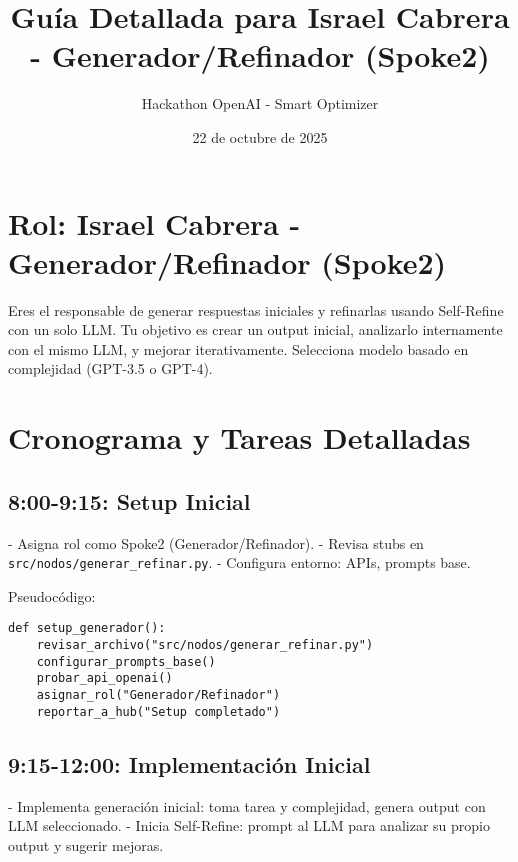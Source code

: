 \documentclass{article}
\title{Guía Detallada para Israel Cabrera - Generador/Refinador (Spoke2)}
\author{Hackathon OpenAI - Smart Optimizer}
\date{22 de octubre de 2025}
\begin{document}
\maketitle

\section{Rol: Israel Cabrera - Generador/Refinador (Spoke2)}
Eres el responsable de generar respuestas iniciales y refinarlas usando Self-Refine con un solo LLM. Tu objetivo es crear un output inicial, analizarlo internamente con el mismo LLM, y mejorar iterativamente. Selecciona modelo basado en complejidad (GPT-3.5 o GPT-4).

\section{Cronograma y Tareas Detalladas}

\subsection{8:00-9:15: Setup Inicial}
- Asigna rol como Spoke2 (Generador/Refinador).
- Revisa stubs en \texttt{src/nodos/generar\_refinar.py}.
- Configura entorno: APIs, prompts base.

Pseudocódigo:
\begin{lstlisting}
def setup_generador():
    revisar_archivo("src/nodos/generar_refinar.py")
    configurar_prompts_base()
    probar_api_openai()
    asignar_rol("Generador/Refinador")
    reportar_a_hub("Setup completado")
\end{lstlisting}

\subsection{9:15-12:00: Implementación Inicial}
- Implementa generación inicial: toma tarea y complejidad, genera output con LLM seleccionado.
- Inicia Self-Refine: prompt al LLM para analizar su propio output y sugerir mejoras.
\end{document}
